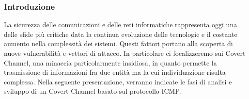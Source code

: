 \begin{frame}
\frametitle{Introduzione} 
La sicurezza delle comunicazioni e delle reti informatiche rappresenta oggi 
una delle sfide più critiche data la continua evoluzione delle tecnologie 
e il costante aumento nella complessità dei sistemi. Questi fattori portano 
alla scoperta di nuove vulnerabilità e vettori di attacco. In particolare 
ci focalizzeremo sui Covert Channel, una minaccia particolarmente insidiosa, 
in quanto permette la trasmissione di informazioni fra due entità ma la 
cui individuazione risulta complessa.
\vspace{2ex} \newline  
Nella seguente presentazione, verranno indicate le fasi di analisi e 
sviluppo di un Covert Channel basato sul protocollo ICMP. 
\end{frame}